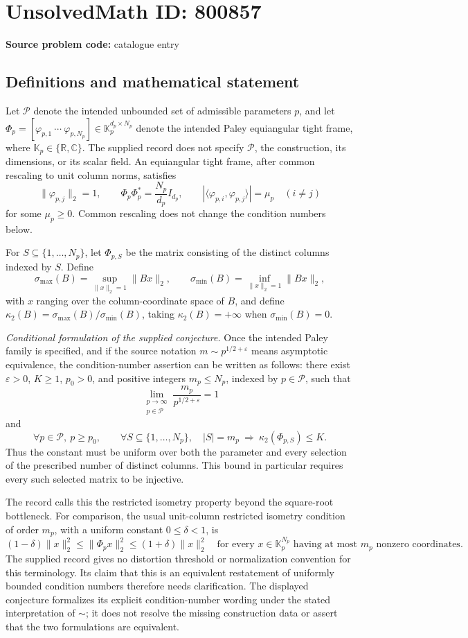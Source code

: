 \documentclass[11pt]{article}
\newcommand{\R}{\mathbb{R}}
\newcommand{\C}{\mathbb{C}}
\begin{document}
\section*{UnsolvedMath ID: 800857}
\textbf{Source problem code:} catalogue entry
\subsection{Definitions and mathematical statement}
Let \(\mathcal P\) denote the intended unbounded set of admissible parameters \(p\), and let \(\Phi_p=[\varphi_{p,1}\ \cdots\ \varphi_{p,N_p}]\in\mathbb K_p^{d_p\times N_p}\) denote the intended Paley equiangular tight frame, where \(\mathbb K_p\in\{\R,\C\}\). The supplied record does not specify \(\mathcal P\), the construction, its dimensions, or its scalar field. An equiangular tight frame, after common rescaling to unit column norms, satisfies
\[
\|\varphi_{p,j}\|_2=1,\qquad
\Phi_p\Phi_p^*=\frac{N_p}{d_p}I_{d_p},\qquad
|\langle\varphi_{p,i},\varphi_{p,j}\rangle|=\mu_p\quad(i\ne j)
\]
for some \(\mu_p\ge0\). Common rescaling does not change the condition numbers below.

For \(S\subseteq\{1,\ldots,N_p\}\), let \(\Phi_{p,S}\) be the matrix consisting of the distinct columns indexed by \(S\). Define
\[
\sigma_{\max}(B)=\sup_{\|x\|_2=1}\|Bx\|_2,\qquad
\sigma_{\min}(B)=\inf_{\|x\|_2=1}\|Bx\|_2,
\]
with \(x\) ranging over the column-coordinate space of \(B\), and define \(\kappa_2(B)=\sigma_{\max}(B)/\sigma_{\min}(B)\), taking \(\kappa_2(B)=+\infty\) when \(\sigma_{\min}(B)=0\).

\emph{Conditional formulation of the supplied conjecture.} Once the intended Paley family is specified, and if the source notation \(m\sim p^{1/2+\varepsilon}\) means asymptotic equivalence, the condition-number assertion can be written as follows: there exist \(\varepsilon>0\), \(K\ge1\), \(p_0>0\), and positive integers \(m_p\le N_p\), indexed by \(p\in\mathcal P\), such that
\[
\lim_{\substack{p\to\infty\\p\in\mathcal P}}
\frac{m_p}{p^{1/2+\varepsilon}}=1
\]
and
\[
\forall p\in\mathcal P,\ p\ge p_0,\qquad
\forall S\subseteq\{1,\ldots,N_p\},\quad
|S|=m_p\ \Longrightarrow\ \kappa_2(\Phi_{p,S})\le K.
\]
Thus the constant must be uniform over both the parameter and every selection of the prescribed number of distinct columns. This bound in particular requires every such selected matrix to be injective.

The record calls this the restricted isometry property beyond the square-root bottleneck. For comparison, the usual unit-column restricted isometry condition of order \(m_p\), with a uniform constant \(0\le\delta<1\), is
\[
(1-\delta)\|x\|_2^2\le\|\Phi_p x\|_2^2
\le(1+\delta)\|x\|_2^2
\quad\text{for every }x\in\mathbb K_p^{N_p}
\text{ having at most }m_p\text{ nonzero coordinates}.
\]
The supplied record gives no distortion threshold or normalization convention for this terminology. Its claim that this is an equivalent restatement of uniformly bounded condition numbers therefore needs clarification. The displayed conjecture formalizes its explicit condition-number wording under the stated interpretation of \(\sim\); it does not resolve the missing construction data or assert that the two formulations are equivalent.
\end{document}
